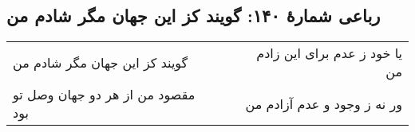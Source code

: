 \begin{center}
\section*{رباعی شمارهٔ ۱۴۰: گویند کز این جهان مگر شادم من }
\label{sec:140}
\begin{longtable}{l p{0.5cm} r}
گویند کز این جهان مگر شادم من 
&&
یا خود ز عدم برای این زادم من
\\
مقصود من از هر دو جهان وصل تو بود
&&
ور نه ز وجود و عدم آزادم من
\\
\end{longtable}
\end{center}
